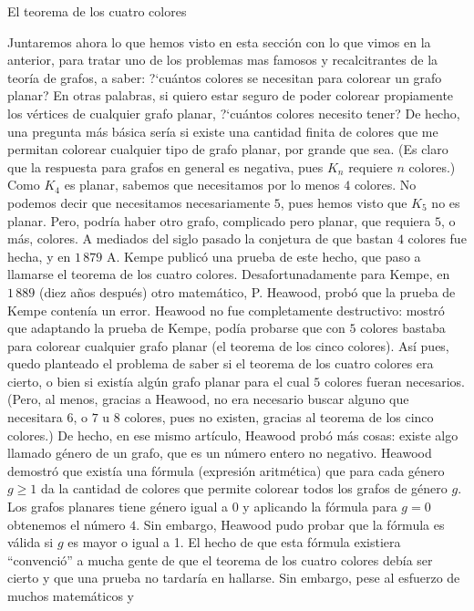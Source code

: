 \begin{section}{El teorema de los cuatro colores} \label{Ap4.3}

Juntaremos ahora lo que hemos visto en esta sección con lo que
vimos en la anterior, para tratar uno de los problemas mas famosos
y recalcitrantes de la teoría de grafos, a saber: ?`cuántos
colores se necesitan para colorear un grafo planar? En otras
palabras, si quiero estar seguro de poder colorear propiamente los
vértices de cualquier grafo planar, ?`cuántos colores necesito
tener? De hecho, una pregunta más básica sería si existe una
cantidad finita de colores que me permitan colorear cualquier tipo
de grafo planar, por grande que sea. (Es claro que la respuesta
para grafos en general es negativa, pues $K_n$ requiere $n$
colores.) Como $K_4$ es planar, sabemos que necesitamos por lo
menos $4$ colores. No podemos decir que necesitamos necesariamente
$5$, pues hemos visto que $K_5$ no es planar. Pero, podría haber
otro grafo, complicado pero planar, que requiera $5$, o más,
colores. A mediados del siglo pasado la conjetura de que bastan $4$
colores fue hecha, y en $1\,879$ A. Kempe publicó una prueba de este
hecho, que paso a llamarse el teorema de los cuatro colores.
Desafortunadamente para Kempe, en $1\,889$ (diez años después) otro
matemático, P. Heawood, probó que la prueba de Kempe contenía un
error. Heawood no fue completamente destructivo: mostró que
adaptando la prueba de Kempe, podía probarse que con $5$ colores
bastaba para colorear cualquier grafo planar (el teorema de los
cinco colores). Así pues, quedo planteado el problema de saber si
el teorema de los cuatro colores era cierto, o bien si existía
algún grafo planar para el cual $5$ colores fueran necesarios.
(Pero, al menos, gracias a Heawood, no era necesario buscar alguno
que necesitara $6$, o $7$ u $8$ colores, pues no existen, gracias al
teorema de los cinco colores.) De hecho, en ese mismo artículo,
Heawood probó más cosas: existe algo llamado género de un grafo,
que es un número entero no negativo. Heawood demostró que existía
una  fórmula (expresión aritmética) que
para cada género $g\ge 1$ da la cantidad de colores que permite
colorear todos los grafos de género $g$. Los grafos planares tiene
género igual a $0$ y aplicando la fórmula para $g=0$ obtenemos el
número $4$. Sin embargo, Heawood pudo probar que la fórmula es
válida si $g$ es mayor o igual a 1. El hecho de que esta fórmula
existiera ``convenció'' a mucha gente de que el teorema de los
cuatro colores debía ser cierto y que una prueba no tardaría en
hallarse. Sin embargo, pese al esfuerzo de muchos matemáticos y

\end{section}
